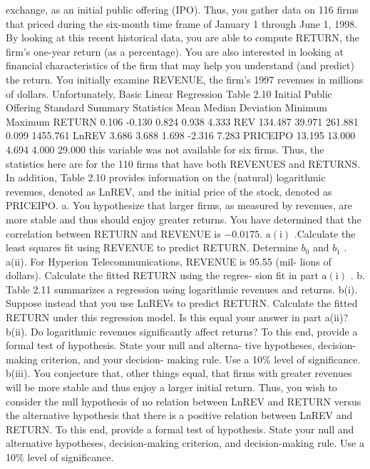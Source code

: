 \documentclass[11pt]{article}
\begin{document}
exchange, as an initial public offering (IPO). Thus, you gather data on 116
firms that priced during the six-month time frame of January 1 through
 June 1, 1998. By looking at this recent historical data, you are able to
 compute RETURN, the firm's one-year return (as a percentage).
You are also interested in looking at financial characteristics of the firm
 that may help you understand (and predict) the return. You initially examine
 REVENUE, the firm's 1997 revenues in millions of dollars. Unfortunately,
 Basic Linear Regression
Table 2.10 Initial
Public Offering Standard
 Summary Statistics Mean Median Deviation Minimum Maximum
RETURN 0.106 -0.130 0.824 0.938 4.333
REV 134.487 39.971 261.881 0.099 1455.761
LnREV 3.686 3.688 1.698 -2.316 7.283
PRICEIPO 13.195 13.000 4.694 4.000 29.000
this variable was not available for six firms. Thus, the statistics here are
 for the 110 firms that have both REVENUES and RETURNS. In addition,
Table 2.10 provides information on the (natural) logarithmic revenues,
denoted as LnREV, and the initial price of the stock, denoted as PRICEIPO.
a. You hypothesize that larger firms, as measured by revenues, are more
stable and thus should enjoy greater returns. You have determined that
the correlation between RETURN and REVENUE is \(- 0 . 0 1 7 5 .\)
\(\mathrm{a ( i )}\) .Calculate the least squares fit using REVENUE to predict
RETURN. Determine \(b_{0}\) and \(b_{1}\) .
a(ii). For Hyperion Telecommunications, REVENUE is 95.55 (mil-
 lions of dollars). Calculate the fitted RETURN using the regres-
 sion fit in part \(\mathrm{a ( i )}\) .
b. Table 2.11 summarizes a regression using logarithmic revenues and
returns.
b(i). Suppose instead that you use LnREVs to predict RETURN.
Calculate the fitted RETURN under this regression model. Is
this equal your answer in part a(ii)?
 b(ii). Do logarithmic revenues significantly affect returns? To this end,
 provide a formal test of hypothesis. State your null and alterna-
tive hypotheses, decision-making criterion, and your decision-
 making rule. Use a 10\% level of significance.
b(iii). You conjecture that, other things equal, that firms with greater
revenues will be more stable and thus enjoy a larger initial return.
Thus, you wish to consider the null hypothesis of no relation
 between LnREV and RETURN versus the alternative hypothesis
 that there is a positive relation between LnREV and RETURN.
To this end, provide a formal test of hypothesis. State your
null and alternative hypotheses, decision-making criterion, and
 decision-making rule. Use a 10\% level of significance.
\end{document}
